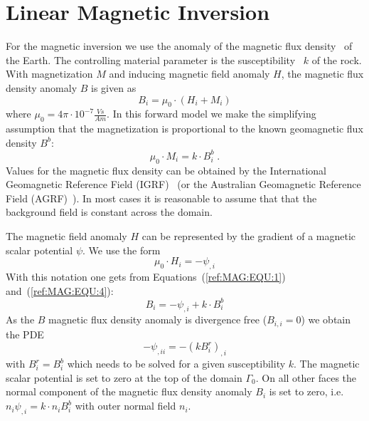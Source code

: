 
%
%
%


\section{Linear Magnetic Inversion}\label{sec:forward magnetic}
For the magnetic inversion we use the anomaly of the magnetic flux
density~ of the Earth.
The controlling material parameter is the susceptibility~
$k$ of the rock.
With magnetization $M$ and inducing magnetic field anomaly $H$, the magnetic
flux density anomaly $B$ is given as
\begin{equation}\label{ref:MAG:EQU:1}
B_i = \mu_0 \cdot ( H_i  + M_i )
\end{equation}
where $\mu_0 = 4 \pi \cdot 10^{-7} \frac{Vs}{Am}$.
In this forward model we make the simplifying assumption that the magnetization
is proportional to the known geomagnetic flux density $B^b$:
\begin{equation}\label{ref:MAG:EQU:4}
\mu_0  \cdot M_i = k \cdot B^b_i \;. 
\end{equation}
Values for the magnetic flux density can be obtained by the International
Geomagnetic Reference Field (IGRF)~\cite{IGRF}
(or the Australian Geomagnetic Reference Field (AGRF)~\cite{AGRF}).
In most cases it is reasonable to assume that that the background field is
constant across the domain.

The magnetic field anomaly $H$ can be represented by the gradient of a
magnetic scalar potential $\psi$.
We use the form 
\begin{equation}\label{ref:MAG:EQU:6}
\mu_0  \cdot H_i = - \psi_{,i}
\end{equation}
With this notation one gets from Equations~(\ref{ref:MAG:EQU:1}) and~(\ref{ref:MAG:EQU:4}):
\begin{equation}\label{ref:MAG:EQU:7}
B_i = - \psi_{,i}  + k \cdot B^b_i
\end{equation}
As the $B$ magnetic flux density anomaly is divergence free ($B_{i,i}=0$) we obtain the PDE
\begin{equation}\label{ref:MAG:EQU:8}
- \psi_{,ii} = - (k B^r_i)_{,i} 
\end{equation} 
with $B^r_i=B^b_i$ which needs to be solved for a given susceptibility $k$.
The magnetic scalar potential is set to zero at the top of the domain
$\Gamma_{0}$.
On all other faces the normal component of the magnetic flux density anomaly
$B_i$ is set to zero, i.e. $n_i \psi_{,i} = k \cdot n_i  B^b_i$ with outer
normal field $n_i$.


